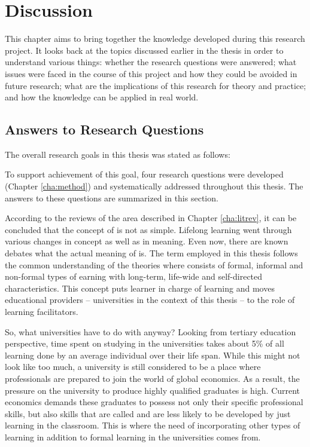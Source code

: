 \chapter{Discussion\label{cha:discussion}}
This chapter aims to bring together the knowledge developed during this research
project. It looks back at the topics discussed earlier in the thesis in order to
understand various things: whether the research questions were answered; what
issues were faced in the course of this project and how they could be avoided in
future research; what are the implications of this research for theory and
practice; and how the knowledge can be applied in real world.


\section{Answers to Research Questions}

The overall research goals in this thesis was stated as follows:


To support achievement of this goal, four research questions were developed
(Chapter \ref{cha:method}) and systematically addressed throughout this thesis.
The answers to these questions are summarized in this section.


According to the reviews of the area described in Chapter \ref{cha:litrev}, it
can be concluded that the concept of \LLLs is not as simple. Lifelong learning
went through various changes in concept as well as in meaning. Even now,
there are known debates what the actual meaning of \LLLs is. The term employed
in this thesis follows the common understanding of the theories where \LLLs
consists of formal, informal and non-formal types of  earning with long-term,
life-wide and self-directed characteristics. This concept puts learner in charge
of learning and moves educational providers -- universities in the context of
this thesis -- to the role of learning facilitators.

So, what universities have to do with \LLLs anyway? Looking from tertiary
education perspective, time spent on studying in the universities takes about
5\% of all learning done by an average individual over their life span. While
this might not look like too much, a university is still considered to be a
place where professionals are prepared to join the world of global economics. As
a result, the pressure on the university to produce highly qualified graduates
is high. Current economics demands these graduates to possess not only their
specific professional skills, but also skills that are called \LLLs and are less
likely to be developed by just learning in the classroom. This is where the
need of incorporating other types of learning in addition to formal learning in
the universities comes from.

